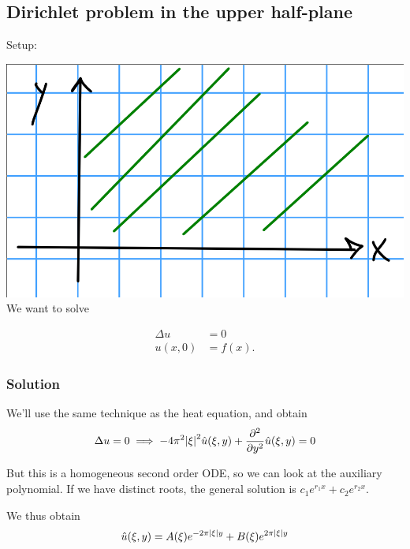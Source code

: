 \hypertarget{dirichlet-problem-in-the-upper-half-plane}{%
\subsection{Dirichlet problem in the upper
half-plane}\label{dirichlet-problem-in-the-upper-half-plane}}

Setup:

\includegraphics{figures/2019-10-31-11:28.png}\\

We want to solve

\begin{align*}
\Delta u  &= 0 \\
u(x, 0)   &= f(x)
.\end{align*}

\hypertarget{solution-1}{%
\subsubsection{Solution}\label{solution-1}}

We'll use the same technique as the heat equation, and obtain
\begin{align*}
\Delta u = 0 \implies -4\pi^2 {\left\lvert {\xi} \right\rvert}^2 \hat{u} (\xi ,y) + {\frac{\partial ^2}{\partial y^2}} \hat{u} (\xi, y) = 0
\end{align*}

But this is a homogeneous second order ODE, so we can look at the
auxiliary polynomial. If we have distinct roots, the general solution is
\(c_1 e^{r_1x} + c_2 e^{r_2 x}\).

We thus obtain
\begin{align*}
\hat{u}(\xi, y) = A(\xi) e^{-2\pi {\left\lvert {\xi} \right\rvert} y} + B(\xi) e^{2\pi {\left\lvert {\xi} \right\rvert} y}
\end{align*}

